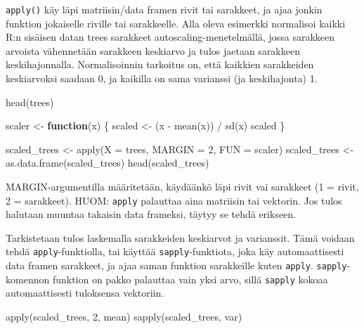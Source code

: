 \documentclass[
]{book}
\newenvironment{Shaded}{\begin{snugshade}}{\end{snugshade}}
\newcommand{\AttributeTok}[1]{\textcolor[rgb]{0.77,0.63,0.00}{#1}}
\newcommand{\ControlFlowTok}[1]{\textcolor[rgb]{0.13,0.29,0.53}{\textbf{#1}}}
\newcommand{\DecValTok}[1]{\textcolor[rgb]{0.00,0.00,0.81}{#1}}
\newcommand{\FunctionTok}[1]{\textcolor[rgb]{0.00,0.00,0.00}{#1}}
\newcommand{\NormalTok}[1]{#1}
\newcommand{\OtherTok}[1]{\textcolor[rgb]{0.56,0.35,0.01}{#1}}
\newcommand{\SpecialCharTok}[1]{\textcolor[rgb]{0.00,0.00,0.00}{#1}}
\begin{document}
\texttt{apply()} käy läpi matriisin/data framen rivit tai sarakkeet, ja ajaa jonkin funktion jokaiselle riville tai sarakkeelle. Alla oleva esimerkki normalisoi kaikki R:n sisäisen datan trees sarakkeet autoscaling-menetelmällä, jossa sarakkeen arvoista vähennetään sarakkeen keskiarvo ja tulos jaetaan sarakkeen keskihajonnalla. Normalisoinnin tarkoitus on, että kaikkien sarakkeiden keskiarvoksi saadaan 0, ja kaikilla on sama varianssi (ja keskihajonta) 1.

\begin{Shaded}
\begin{Highlighting}[]
\FunctionTok{head}\NormalTok{(trees)}

\NormalTok{scaler }\OtherTok{\textless{}{-}} \ControlFlowTok{function}\NormalTok{(x) \{}
\NormalTok{  scaled }\OtherTok{\textless{}{-}}\NormalTok{ (x }\SpecialCharTok{{-}} \FunctionTok{mean}\NormalTok{(x)) }\SpecialCharTok{/} \FunctionTok{sd}\NormalTok{(x)}
\NormalTok{  scaled}
\NormalTok{\}}

\NormalTok{scaled\_trees }\OtherTok{\textless{}{-}} \FunctionTok{apply}\NormalTok{(}\AttributeTok{X =}\NormalTok{ trees, }\AttributeTok{MARGIN =} \DecValTok{2}\NormalTok{, }\AttributeTok{FUN =}\NormalTok{ scaler)}
\NormalTok{scaled\_trees }\OtherTok{\textless{}{-}} \FunctionTok{as.data.frame}\NormalTok{(scaled\_trees)}
\FunctionTok{head}\NormalTok{(scaled\_trees)}
\end{Highlighting}
\end{Shaded}

MARGIN-argumentilla määritetään, käydäänkö läpi rivit vai sarakkeet (1 = rivit, 2 = sarakkeet). HUOM: \texttt{apply} palauttaa aina matriisin tai vektorin. Jos tulos halutaan muuntaa takaisin data frameksi, täytyy se tehdä erikseen.

Tarkistetaan tulos laskemalla sarakkeiden keskiarvot ja varianssit. Tämä voidaan tehdä \texttt{apply}-funktiolla, tai käyttää \texttt{sapply}-funktiota, joka käy automaattisesti data framen sarakkeet, ja ajaa saman funktion sarakkeille kuten \texttt{apply}. \texttt{sapply}-komennon funktion on pakko palauttaa vain yksi arvo, sillä \texttt{sapply} kokoaa automaattisesti tuloksensa vektoriin.

\begin{Shaded}
\begin{Highlighting}[]
\FunctionTok{apply}\NormalTok{(scaled\_trees, }\DecValTok{2}\NormalTok{, mean)}
\FunctionTok{sapply}\NormalTok{(scaled\_trees, var)}
\end{Highlighting}
\end{Shaded}
\end{document}
